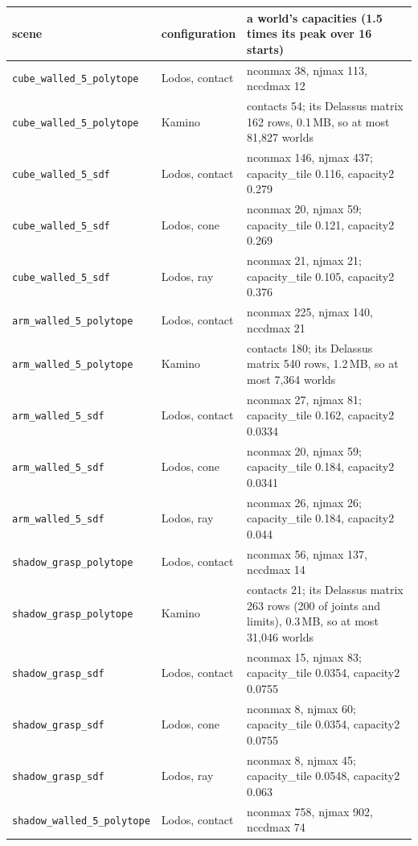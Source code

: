 \begin{longtable}{@{}llp{9.5cm}@{}}
\toprule
scene & configuration & a world's capacities (1.5 times its peak over 16 starts) \\
\midrule
\endhead
\texttt{cube\_walled\_5\_polytope} & Lodos, contact & nconmax 38, njmax 113, nccdmax 12 \\
\texttt{cube\_walled\_5\_polytope} & Kamino & contacts 54; its Delassus matrix 162 rows, 0.1\,MB, so at most 81,827 worlds \\
\texttt{cube\_walled\_5\_sdf} & Lodos, contact & nconmax 146, njmax 437; capacity\_tile 0.116, capacity2 0.279 \\
\texttt{cube\_walled\_5\_sdf} & Lodos, cone & nconmax 20, njmax 59; capacity\_tile 0.121, capacity2 0.269 \\
\texttt{cube\_walled\_5\_sdf} & Lodos, ray & nconmax 21, njmax 21; capacity\_tile 0.105, capacity2 0.376 \\
\texttt{arm\_walled\_5\_polytope} & Lodos, contact & nconmax 225, njmax 140, nccdmax 21 \\
\texttt{arm\_walled\_5\_polytope} & Kamino & contacts 180; its Delassus matrix 540 rows, 1.2\,MB, so at most 7,364 worlds \\
\texttt{arm\_walled\_5\_sdf} & Lodos, contact & nconmax 27, njmax 81; capacity\_tile 0.162, capacity2 0.0334 \\
\texttt{arm\_walled\_5\_sdf} & Lodos, cone & nconmax 20, njmax 59; capacity\_tile 0.184, capacity2 0.0341 \\
\texttt{arm\_walled\_5\_sdf} & Lodos, ray & nconmax 26, njmax 26; capacity\_tile 0.184, capacity2 0.044 \\
\texttt{shadow\_grasp\_polytope} & Lodos, contact & nconmax 56, njmax 137, nccdmax 14 \\
\texttt{shadow\_grasp\_polytope} & Kamino & contacts 21; its Delassus matrix 263 rows (200 of joints and limits), 0.3\,MB, so at most 31,046 worlds \\
\texttt{shadow\_grasp\_sdf} & Lodos, contact & nconmax 15, njmax 83; capacity\_tile 0.0354, capacity2 0.0755 \\
\texttt{shadow\_grasp\_sdf} & Lodos, cone & nconmax 8, njmax 60; capacity\_tile 0.0354, capacity2 0.0755 \\
\texttt{shadow\_grasp\_sdf} & Lodos, ray & nconmax 8, njmax 45; capacity\_tile 0.0548, capacity2 0.063 \\
\texttt{shadow\_walled\_5\_polytope} & Lodos, contact & nconmax 758, njmax 902, nccdmax 74 \\

\end{longtable}
